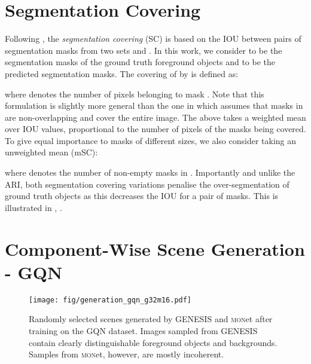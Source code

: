 \documentclass{article}
\begin{document}
\section{Segmentation Covering}
\label{app:segmentation_covering}

Following \citet{arbelaez2010contour}, the \emph{segmentation covering} (SC) is based on the \gls{IOU} between pairs of segmentation masks from two sets  and .
In this work, we consider  to be the segmentation masks of the ground truth foreground objects and  to be the predicted segmentation masks.
The covering of  by  is defined as:

where  denotes the number of pixels belonging to mask .
Note that this formulation is slightly more general than the one in \citet{arbelaez2010contour} which assumes that masks in  are non-overlapping and cover the entire image.
The above takes a weighted mean over \gls{IOU} values, proportional to the number of pixels of the masks being covered.
To give equal importance to masks of different sizes, we also consider taking an unweighted mean (mSC):

where  denotes the number of non-empty masks in . Importantly and unlike the ARI, both segmentation covering variations penalise the over-segmentation of ground truth objects as this decreases the \gls{IOU} for a pair of masks.
This is illustrated in , .


\clearpage















\section{Component-Wise Scene Generation - GQN}
\label{app:generation}


\begin{figure}[h]
    \centering
    \texttt{[image: fig/generation\_gqn\_g32m16.pdf]}
    \caption{Randomly selected scenes generated by \gls{GENESIS} and \textsc{mon}et after training on the GQN dataset.
    Images sampled from \gls{GENESIS} contain clearly distinguishable foreground objects and backgrounds. Samples from \textsc{mon}et, however, are mostly incoherent.}
    \label{fig:generation_gqn_g32m16}
\end{figure}
\end{document}
